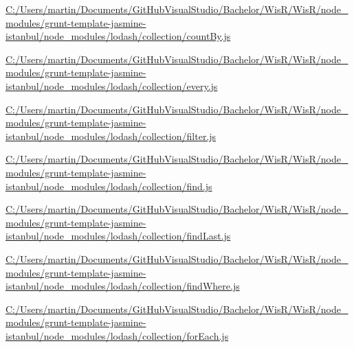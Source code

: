 \begin{DoxyCompactItemize}
\item 
\hyperlink{_c_1_2_users_2martin_2_documents_2_git_hub_visual_studio_2_bachelor_2_wis_r_2_wis_r_2node_module12bdd52de042467a472426aa687c65d3}{C\+:/\+Users/martin/\+Documents/\+Git\+Hub\+Visual\+Studio/\+Bachelor/\+Wis\+R/\+Wis\+R/node\+\_\+modules/grunt-\/template-\/jasmine-\/istanbul/node\+\_\+modules/lodash/collection/count\+By.\+js}
\item 
\hyperlink{_c_1_2_users_2martin_2_documents_2_git_hub_visual_studio_2_bachelor_2_wis_r_2_wis_r_2node_module84271da04e2b06b523c5c3ca22a8a994}{C\+:/\+Users/martin/\+Documents/\+Git\+Hub\+Visual\+Studio/\+Bachelor/\+Wis\+R/\+Wis\+R/node\+\_\+modules/grunt-\/template-\/jasmine-\/istanbul/node\+\_\+modules/lodash/collection/every.\+js}
\item 
\hyperlink{_c_1_2_users_2martin_2_documents_2_git_hub_visual_studio_2_bachelor_2_wis_r_2_wis_r_2node_modulec4e75dbfefebe0685e0a78e0d2f45b90}{C\+:/\+Users/martin/\+Documents/\+Git\+Hub\+Visual\+Studio/\+Bachelor/\+Wis\+R/\+Wis\+R/node\+\_\+modules/grunt-\/template-\/jasmine-\/istanbul/node\+\_\+modules/lodash/collection/filter.\+js}
\item 
\hyperlink{_c_1_2_users_2martin_2_documents_2_git_hub_visual_studio_2_bachelor_2_wis_r_2_wis_r_2node_module9b78c9929b6e9e99dc81015a36994d10}{C\+:/\+Users/martin/\+Documents/\+Git\+Hub\+Visual\+Studio/\+Bachelor/\+Wis\+R/\+Wis\+R/node\+\_\+modules/grunt-\/template-\/jasmine-\/istanbul/node\+\_\+modules/lodash/collection/find.\+js}
\item 
\hyperlink{_c_1_2_users_2martin_2_documents_2_git_hub_visual_studio_2_bachelor_2_wis_r_2_wis_r_2node_moduleba18a0a76f82db5f4be386597c29a785}{C\+:/\+Users/martin/\+Documents/\+Git\+Hub\+Visual\+Studio/\+Bachelor/\+Wis\+R/\+Wis\+R/node\+\_\+modules/grunt-\/template-\/jasmine-\/istanbul/node\+\_\+modules/lodash/collection/find\+Last.\+js}
\item 
\hyperlink{_c_1_2_users_2martin_2_documents_2_git_hub_visual_studio_2_bachelor_2_wis_r_2_wis_r_2node_modulebb9a610d07bdfadc7a7de5fedd69f873}{C\+:/\+Users/martin/\+Documents/\+Git\+Hub\+Visual\+Studio/\+Bachelor/\+Wis\+R/\+Wis\+R/node\+\_\+modules/grunt-\/template-\/jasmine-\/istanbul/node\+\_\+modules/lodash/collection/find\+Where.\+js}
\item 
\hyperlink{_c_1_2_users_2martin_2_documents_2_git_hub_visual_studio_2_bachelor_2_wis_r_2_wis_r_2node_modulea6e3a9f457749db77a43634873520462}{C\+:/\+Users/martin/\+Documents/\+Git\+Hub\+Visual\+Studio/\+Bachelor/\+Wis\+R/\+Wis\+R/node\+\_\+modules/grunt-\/template-\/jasmine-\/istanbul/node\+\_\+modules/lodash/collection/for\+Each.\+js}

\end{DoxyCompactItemize}
